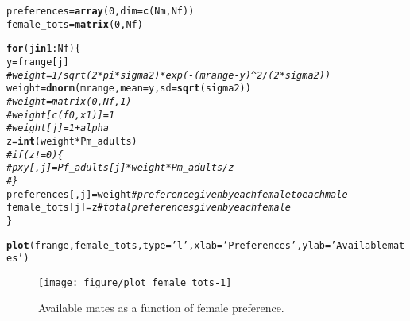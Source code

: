\documentclass{article}\usepackage[]{graphicx}\usepackage[]{color}
\makeatletter
\def\maxwidth{ %
  \ifdim\Gin@nat@width>\linewidth
    \linewidth
  \else
    \Gin@nat@width
  \fi
}
\newcommand{\hlnum}[1]{\textcolor[rgb]{0.686,0.059,0.569}{#1}}%
\newcommand{\hlstr}[1]{\textcolor[rgb]{0.192,0.494,0.8}{#1}}%
\newcommand{\hlcom}[1]{\textcolor[rgb]{0.678,0.584,0.686}{\textit{#1}}}%
\newcommand{\hlopt}[1]{\textcolor[rgb]{0,0,0}{#1}}%
\newcommand{\hlstd}[1]{\textcolor[rgb]{0.345,0.345,0.345}{#1}}%
\newcommand{\hlkwa}[1]{\textcolor[rgb]{0.161,0.373,0.58}{\textbf{#1}}}%
\newcommand{\hlkwb}[1]{\textcolor[rgb]{0.69,0.353,0.396}{#1}}%
\newcommand{\hlkwc}[1]{\textcolor[rgb]{0.333,0.667,0.333}{#1}}%
\newcommand{\hlkwd}[1]{\textcolor[rgb]{0.737,0.353,0.396}{\textbf{#1}}}%
\newenvironment{kframe}{%
 \def\at@end@of@kframe{}%
 \ifinner\ifhmode%
  \def\at@end@of@kframe{\end{minipage}}%
  \begin{minipage}{\columnwidth}%
 \fi\fi%
 \def\FrameCommand##1{\hskip\@totalleftmargin \hskip-\fboxsep
 \colorbox{shadecolor}{##1}\hskip-\fboxsep
     \hskip-\linewidth \hskip-\@totalleftmargin \hskip\columnwidth}%
 \MakeFramed {\advance\hsize-\width
   \@totalleftmargin\z@ \linewidth\hsize
   \@setminipage}}%
 {\par\unskip\endMakeFramed%
 \at@end@of@kframe}
\newenvironment{knitrout}{}{} %
\makeatother
\begin{document}
\begin{knitrout}
\begin{kframe}
\begin{alltt}
\hlstd{preferences} \hlkwb{=} \hlkwd{array}\hlstd{(}\hlnum{0}\hlstd{,}\hlkwc{dim}\hlstd{=}\hlkwd{c}\hlstd{(Nm,Nf))}
\hlstd{female_tots} \hlkwb{=} \hlkwd{matrix}\hlstd{(}\hlnum{0}\hlstd{,Nf)}

\hlkwa{for}\hlstd{(j} \hlkwa{in} \hlnum{1}\hlopt{:}\hlstd{Nf)\{}
        \hlstd{y} \hlkwb{=} \hlstd{frange[j]}
        \hlcom{# weight = 1/sqrt(2*pi*sigma2)*exp(-(mrange-y)^2/(2*sigma2))}
        \hlstd{weight} \hlkwb{=} \hlkwd{dnorm}\hlstd{(mrange,}\hlkwc{mean}\hlstd{=y,}\hlkwc{sd}\hlstd{=}\hlkwd{sqrt}\hlstd{(sigma2))}
        \hlcom{# weight = matrix (0,Nf,1)}
        \hlcom{# weight[c(f0,x1)] = 1}
        \hlcom{# weight[j] = 1+alpha}
        \hlstd{z} \hlkwb{=} \hlkwd{int}\hlstd{(weight}\hlopt{*}\hlstd{Pm_adults)}
        \hlcom{# if(z!=0)\{}
                \hlcom{# pxy[,j] = Pf_adults[j]*weight*Pm_adults/z}
                \hlcom{# \}}
        \hlstd{preferences[,j]} \hlkwb{=} \hlstd{weight} \hlcom{#preference given by each female to each male}
        \hlstd{female_tots[j]} \hlkwb{=} \hlstd{z} \hlcom{#total preferences given by each female}
\hlstd{\}}
\end{alltt}
\end{kframe}
\end{knitrout}

\begin{knitrout}
\color{fgcolor}\begin{kframe}
\begin{alltt}
\hlkwd{plot}\hlstd{(frange, female_tots,} \hlkwc{type}\hlstd{=}\hlstr{'l'}\hlstd{,} \hlkwc{xlab} \hlstd{=} \hlstr{'Preferences'}\hlstd{,}\hlkwc{ylab} \hlstd{=} \hlstr{'Available mates'}\hlstd{)}
\end{alltt}
\end{kframe}\begin{figure}
\texttt{[image: figure/plot\_female\_tots-1]} \caption[Available mates as a function of female preference]{Available mates as a function of female preference.}\label{fig:plot_female_tots}
\end{figure}


\end{knitrout}


\end{document}
